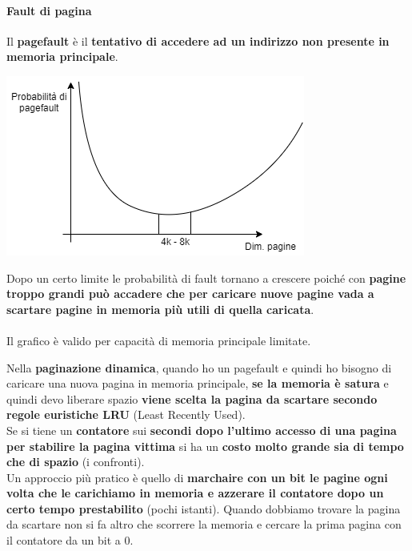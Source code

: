 \documentclass[10pt]{report}
\begin{document}
\paragraph{Fault di pagina} Il \textbf{pagefault} è il \textbf{tentativo di accedere ad un indirizzo non presente in memoria principale}.
\begin{multicols}{2}
\begin{center}
\includegraphics[scale=0.65]{pagefaultplot.png}
\end{center}
Dopo un certo limite le probabilità di fault tornano a crescere poiché con \textbf{pagine troppo grandi può accadere che per caricare nuove pagine vada a scartare pagine in memoria più utili di quella caricata}.\\\\
Il grafico è valido per capacità di memoria principale limitate.
\end{multicols}
Nella \textbf{paginazione dinamica}, quando ho un pagefault e quindi ho bisogno di caricare una nuova pagina in memoria principale, \textbf{se la memoria è satura} e quindi devo liberare spazio \textbf{viene scelta la pagina da scartare secondo regole euristiche LRU} (Least Recently Used).\\
Se si tiene un \textbf{contatore} sui \textbf{secondi dopo l'ultimo accesso di una pagina per stabilire la pagina vittima} si ha un \textbf{costo molto grande sia di tempo che di spazio} (i confronti).\\
Un approccio più pratico è quello di \textbf{marchaire con un bit le pagine ogni volta che le carichiamo in memoria e azzerare il contatore dopo un certo tempo prestabilito} (pochi istanti). Quando dobbiamo trovare la pagina da scartare non si fa altro che scorrere la memoria e cercare la prima pagina con il contatore da un bit a 0.
\pagebreak
\end{document}
